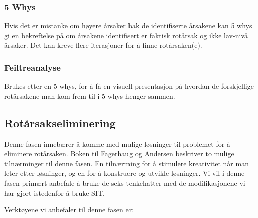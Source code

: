 \subsubsection{5 Whys} Hvis det er mistanke om høyere årsaker bak de identifiserte årsakene kan 5 whys gi en bekreftelse på om årsakene identifisert er faktisk rotårsak og ikke lav-nivå årsaker. Det kan kreve flere iterasjoner for å finne rotårsaken(e).  
    
\subsubsection{Feiltreanalyse} Brukes etter en 5 whys, for å få en visuell presentasjon på hvordan de forskjellige rotårsakene man kom frem til i 5 whys henger sammen.


\subsection{Rotårsakseliminering}
Denne fasen innebærer å komme med mulige løsninger til problemet for å eliminere rotårsaken. Boken til Fagerhaug og Andersen \cite{RCA} beskriver to mulige tilnærminger til denne fasen. En tilnærming for å stimulere kreativitet når man leter etter løsninger, og en for å konstruere og utvikle løsninger. Vi vil i denne fasen primært anbefale å bruke de seks tenkehatter med de modifikasjonene vi har gjort istedenfor å bruke SIT.

Verktøyene vi anbefaler til denne fasen er:
